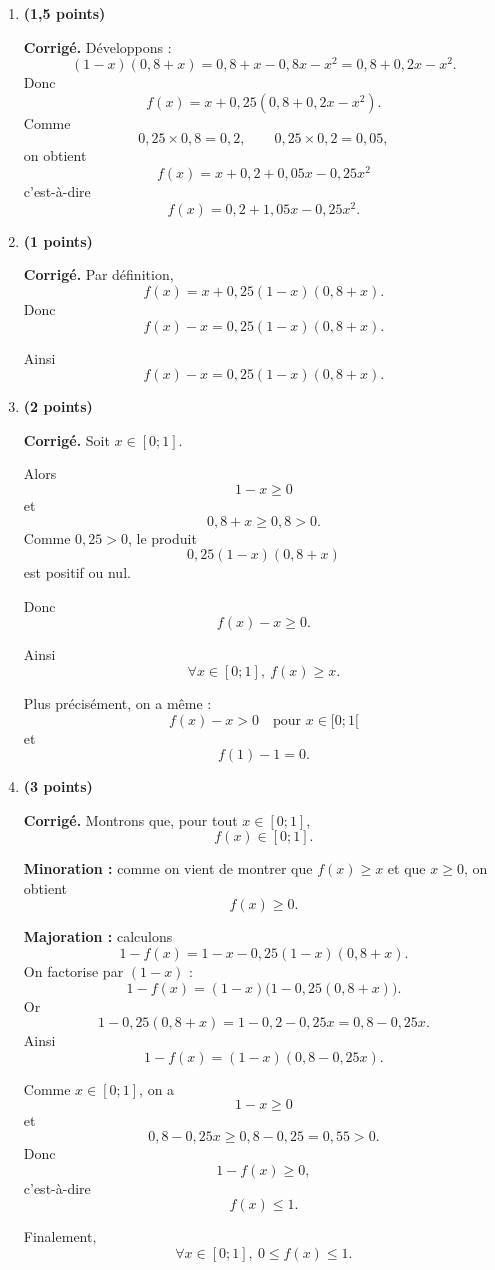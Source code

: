 \documentclass[11pt,a4paper]{article}
\newcommand{\bareme}[1]{\hfill{\color{blue!70!black}\textbf{(#1 points)}}}
\newcommand{\corr}{\noindent\textcolor{blue!70!black}{\textbf{Corrigé. }}}
\begin{document}
\begin{enumerate}[label=\textbf{A.\arabic*.}, leftmargin=0.9cm]

\item \bareme{1,5}

\corr Développons :
\[
(1-x)(0{,}8+x)=0{,}8+x-0{,}8x-x^2=0{,}8+0{,}2x-x^2.
\]
Donc
\[
f(x)=x+0{,}25(0{,}8+0{,}2x-x^2).
\]
Comme
\[
0{,}25\times 0{,}8=0{,}2,\qquad 0{,}25\times 0{,}2=0{,}05,
\]
on obtient
\[
\boxed{f(x)=x+0{,}2+0{,}05x-0{,}25x^2}
\]
c’est-à-dire
\[
\boxed{f(x)=0{,}2+1{,}05x-0{,}25x^2.}
\]

\item \bareme{1}

\corr Par définition,
\[
f(x)=x+0{,}25(1-x)(0{,}8+x).
\]
Donc
\[
f(x)-x=0{,}25(1-x)(0{,}8+x).
\]

Ainsi
\[
\boxed{f(x)-x=0{,}25(1-x)(0{,}8+x).}
\]

\item \bareme{2}

\corr Soit $x\in[0;1]$.

Alors
\[
1-x\geq 0
\]
et
\[
0{,}8+x\geq 0{,}8>0.
\]
Comme $0{,}25>0$, le produit
\[
0{,}25(1-x)(0{,}8+x)
\]
est positif ou nul.

Donc
\[
f(x)-x\geq 0.
\]

Ainsi
\[
\boxed{\forall x\in[0;1],\ f(x)\geq x.}
\]

Plus précisément, on a même :
\[
f(x)-x>0 \quad \text{pour } x\in[0;1[
\]
et
\[
f(1)-1=0.
\]

\item \bareme{3}

\corr Montrons que, pour tout $x\in[0;1]$,
\[
f(x)\in[0;1].
\]

\textbf{Minoration :} comme on vient de montrer que $f(x)\geq x$ et que $x\geq 0$, on obtient
\[
f(x)\geq 0.
\]

\textbf{Majoration :} calculons
\[
1-f(x)=1-x-0{,}25(1-x)(0{,}8+x).
\]
On factorise par $(1-x)$ :
\[
1-f(x)=(1-x)\bigl(1-0{,}25(0{,}8+x)\bigr).
\]
Or
\[
1-0{,}25(0{,}8+x)=1-0{,}2-0{,}25x=0{,}8-0{,}25x.
\]
Ainsi
\[
1-f(x)=(1-x)(0{,}8-0{,}25x).
\]

Comme $x\in[0;1]$, on a
\[
1-x\geq 0
\]
et
\[
0{,}8-0{,}25x\geq 0{,}8-0{,}25=0{,}55>0.
\]
Donc
\[
1-f(x)\geq 0,
\]
c’est-à-dire
\[
f(x)\leq 1.
\]

Finalement,
\[
\boxed{\forall x\in[0;1],\ 0\leq f(x)\leq 1.}
\]

\end{enumerate}

\medskip
\end{document}
